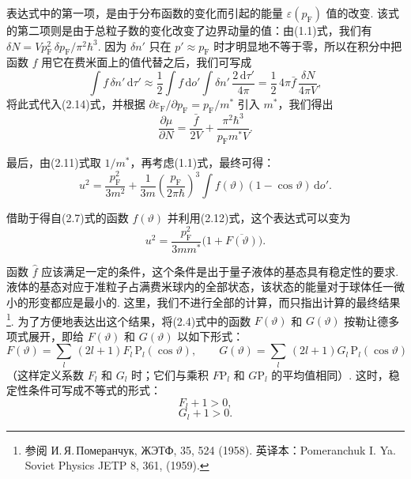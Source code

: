 表达式中的第一项，是由于分布函数的变化而引起的能量 $\varepsilon(p_{\mathrm F})$ 值的改变. 该式的第二项则是由于总粒子数的变化改变了边界动量的值：由(1.1)式，我们有 $\delta N=Vp_{\mathrm F}^{2}\,\delta p_{\mathrm F}/\pi^{2}\hbar^{3}$. 因为 $\delta n'$ 只在 $p'\approx p_{\mathrm F}$ 时才明显地不等于零，所以在积分中把函数 $f$ 用它在费米面上的值代替之后，我们可写成
\begin{equation*}
\int f\,\delta n'\,\mathrm{d}\tau'\approx\frac{1}{2}\int f\,\mathrm{d}o'\int\delta n'\,\frac{2\,\mathrm{d}\tau'}{4\pi}=\frac{1}{2}\,4\pi\bar f\,\frac{\delta N}{4\pi V},
\end{equation*}
将此式代入(2.14)式，并根据 $\partial\varepsilon_{\mathrm F}/\partial p_{\mathrm F}=p_{\mathrm F}/m^{*}$ 引入 $m^{*}$，我们得出
\begin{equation}
\frac{\partial\mu}{\partial N}=\frac{\bar f}{2V}+\frac{\pi^{2}\hbar^{3}}{p_{\mathrm F}m^{*}V}.
\end{equation}

最后，由(2.11)式取 $1/m^{*}$，再考虑(1.1)式，最终可得：
\begin{equation}
u^{2}=\frac{p_{\mathrm F}^{2}}{3m^{2}}+\frac{1}{3m}\left(\frac{p_{\mathrm F}}{2\pi\hbar}\right)^{3}\int f(\vartheta)(1-\cos\vartheta)\,\mathrm{d}o'.
\end{equation}

借助于得自(2.7)式的函数 $f(\vartheta)$ 并利用(2.12)式，这个表达式可以变为
\begin{equation}
u^{2}=\frac{p_{\mathrm F}^{2}}{3mm^{*}}\bigl(1+\overline{F(\vartheta)}\bigr).
\end{equation}

函数 $\hat f$ 应该满足一定的条件，这个条件是出于量子液体的基态具有稳定性的要求. 液体的基态对应于准粒子占满费米球内的全部状态，该状态的能量对于球体任一微小的形变都应是最小的. 这里，我们不进行全部的计算，而只指出计算的最终结果\footnote{参阅 И.\,Я.\,Померанчук, ЖЭТФ, 35, 524 (1958). 英译本：Pomeranchuk I. Ya. Soviet Physics JETP 8, 361, (1959).}. 为了方便地表达出这个结果，将(2.4)式中的函数 $F(\vartheta)$ 和 $G(\vartheta)$ 按勒让德多项式展开，即给 $F(\vartheta)$ 和 $G(\vartheta)$ 以如下形式：
\begin{equation}
F(\vartheta)=\sum_{l}\,(2l+1)F_{l}\,\mathrm{P}_{l}(\cos\vartheta),\qquad
G(\vartheta)=\sum_{l}\,(2l+1)G_{l}\,\mathrm{P}_{l}(\cos\vartheta)
\end{equation}
（这样定义系数 $F_{l}$ 和 $G_{l}$ 时；它们与乘积 $F\mathrm{P}_{l}$ 和 $G\mathrm{P}_{l}$ 的平均值相同）. 这时，稳定性条件可写成不等式的形式：
\begin{equation}
F_{l}+1>0,
\end{equation}
\begin{equation}
G_{l}+1>0.
\end{equation}

